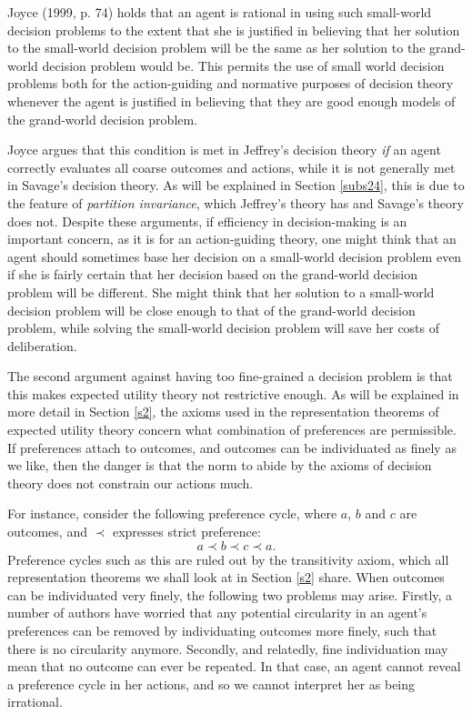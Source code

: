 Joyce (1999, p. 74) holds that an agent is rational in using such small-world decision problems to the extent that she is justified in believing that her solution to the small-world decision problem will be the same as her solution to the grand-world decision problem would be. This permits the use of small world decision problems both for the action-guiding and normative purposes of decision theory whenever the agent is justified in believing that they are good enough models of the grand-world decision problem.

Joyce argues that this condition is met in Jeffrey's decision theory {\em if} an agent correctly evaluates all coarse outcomes and actions, while it is not generally met in Savage's decision theory. As will be explained in Section \ref{subs24}, this is due to the feature of {\em partition invariance}, which Jeffrey's theory has and Savage's theory does not. Despite these arguments, if efficiency in decision-making is an important concern, as it is for an action-guiding theory, one might think that an agent should sometimes base her decision on a small-world decision problem even if she is fairly certain that her decision based on the grand-world decision problem will be different. She might think that her solution to a small-world decision problem will be close enough to that of the grand-world decision problem, while solving the small-world decision problem will save her costs of deliberation.

The second argument against having too fine-grained a decision problem is that this makes expected utility theory not restrictive enough. As will be explained in more detail in Section \ref{s2}, the axioms used in the representation theorems of expected utility theory concern what combination of preferences are permissible. If preferences attach to outcomes, and outcomes can be individuated as finely as we like, then the danger is that the norm to abide by the axioms of decision theory does not constrain our actions much.

For instance, consider the following preference cycle, where $a$, $b$ and $c$ are outcomes, and $\prec$ expresses strict preference:
$$a \prec b \prec c \prec a.$$
Preference cycles such as this are ruled out by the transitivity axiom, which all representation theorems we shall look at in Section \ref{s2} share. When outcomes can be individuated very finely, the following two problems may arise. Firstly, a number of authors have worried that any potential circularity in an agent's preferences can be removed by individuating outcomes more finely, such that there is no circularity anymore. Secondly, and relatedly, fine individuation may mean that no outcome can ever be repeated. In that case, an agent cannot reveal a preference cycle in her actions, and so we cannot interpret her as being irrational.

